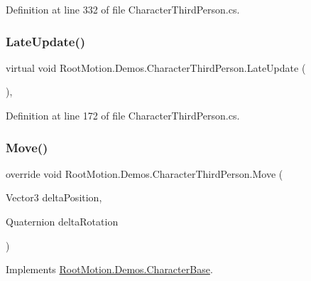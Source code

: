 Definition at line 332 of file Character\+Third\+Person.\+cs.

\mbox{\label{class_root_motion_1_1_demos_1_1_character_third_person_a0f0ae107d845d0881d1f8b1853df7a89}} 
\subsubsection{\texorpdfstring{Late\+Update()}{LateUpdate()}}
{\footnotesize\ttfamily virtual void Root\+Motion.\+Demos.\+Character\+Third\+Person.\+Late\+Update (\begin{DoxyParamCaption}{ }\end{DoxyParamCaption})\hspace{0.3cm}{\ttfamily [protected]}, {\ttfamily [virtual]}}



Definition at line 172 of file Character\+Third\+Person.\+cs.

\mbox{\label{class_root_motion_1_1_demos_1_1_character_third_person_a6100d2dbc651cfb14d253c09dc67f8b1}} 
\subsubsection{\texorpdfstring{Move()}{Move()}}
{\footnotesize\ttfamily override void Root\+Motion.\+Demos.\+Character\+Third\+Person.\+Move (\begin{DoxyParamCaption}\item[{Vector3}]{delta\+Position,  }\item[{Quaternion}]{delta\+Rotation }\end{DoxyParamCaption})\hspace{0.3cm}{\ttfamily [virtual]}}



Implements \mbox{\hyperlink{class_root_motion_1_1_demos_1_1_character_base_aef8d13b7c1e76de057486d81a6f3d0cb}{Root\+Motion.\+Demos.\+Character\+Base}}.



